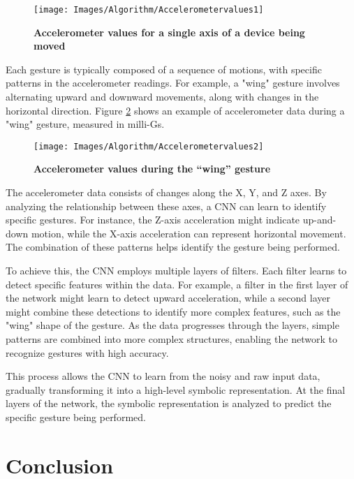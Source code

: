 \begin{figure}[h!]
	\centering
	\texttt{[image: Images/Algorithm/Accelerometervalues1]}
	\caption{\textbf{Accelerometer values for a single axis of a device being moved} \cite{Warden:2020}}
	\label{Fig:5.7}
\end{figure}

Each gesture is typically composed of a sequence of motions, with specific patterns in the accelerometer readings. For example, a "wing" gesture involves alternating upward and downward movements, along with changes in the horizontal direction. Figure \ref{Fig:5.8} shows an example of accelerometer data during a "wing" gesture, measured in milli-Gs.

\begin{figure}[h!]
	\centering
	\texttt{[image: Images/Algorithm/Accelerometervalues2]}
	\caption{\textbf{Accelerometer values during the “wing” gesture} \cite{Warden:2020}}
	\label{Fig:5.8}
\end{figure}

The accelerometer data consists of changes along the X, Y, and Z axes. By analyzing the relationship between these axes, a CNN can learn to identify specific gestures. For instance, the Z-axis acceleration might indicate up-and-down motion, while the X-axis acceleration can represent horizontal movement. The combination of these patterns helps identify the gesture being performed.

To achieve this, the CNN employs multiple layers of filters. Each filter learns to detect specific features within the data. For example, a filter in the first layer of the network might learn to detect upward acceleration, while a second layer might combine these detections to identify more complex features, such as the "wing" shape of the gesture. As the data progresses through the layers, simple patterns are combined into more complex structures, enabling the network to recognize gestures with high accuracy.

This process allows the CNN to learn from the noisy and raw input data, gradually transforming it into a high-level symbolic representation. At the final layers of the network, the symbolic representation is analyzed to predict the specific gesture being performed.

\section{Conclusion}

